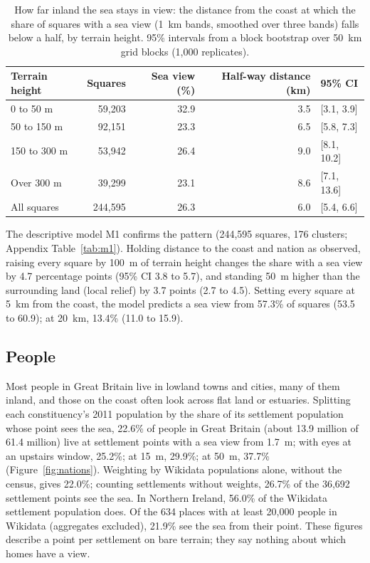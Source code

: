 \documentclass[11pt,a4paper]{article}
\begin{document}
\begin{table}[tbp]\centering\small\caption{How far inland the sea stays in view: the distance from the coast at which the share of squares with a sea view (1~km bands, smoothed over three bands) falls below a half, by terrain height. 95\% intervals from a block bootstrap over 50~km grid blocks (1,000 replicates).}\label{tab:reach}\begin{tabular}{lrrrl}\toprule Terrain height & Squares & Sea view (\%) & Half-way distance (km) & 95\% CI\\\midrule
0 to 50 m & 59,203 & 32.9 & 3.5 & [3.1, 3.9]\\
50 to 150 m & 92,151 & 23.3 & 6.5 & [5.8, 7.3]\\
150 to 300 m & 53,942 & 26.4 & 9.0 & [8.1, 10.2]\\
Over 300 m & 39,299 & 23.1 & 8.6 & [7.1, 13.6]\\
\midrule All squares & 244,595 & 26.3 & 6.0 & [5.4, 6.6]\\
\bottomrule\end{tabular}\end{table}

The descriptive model M1 confirms the pattern (244,595 squares, 176 clusters; Appendix Table~\ref{tab:m1}). Holding distance to the coast and nation as observed, raising every square by 100~m of terrain height changes the share with a sea view by 4.7 percentage points (95\% CI 3.8 to 5.7), and standing 50~m higher than the surrounding land (local relief) by 3.7 points (2.7 to 4.5). Setting every square at 5~km from the coast, the model predicts a sea view from 57.3\% of squares (53.5 to 60.9); at 20~km, 13.4\% (11.0 to 15.9).

\subsection{People}
Most people in Great Britain live in lowland towns and cities, many of them inland, and those on the coast often look across flat land or estuaries. Splitting each constituency's 2011 population by the share of its settlement population whose point sees the sea, 22.6\% of people in Great Britain (about 13.9 million of 61.4 million) live at settlement points with a sea view from 1.7~m; with eyes at an upstairs window, 25.2\%; at 15~m, 29.9\%; at 50~m, 37.7\% (Figure~\ref{fig:nations}). Weighting by Wikidata populations alone, without the census, gives 22.0\%; counting settlements without weights, 26.7\% of the 36,692 settlement points see the sea. In Northern Ireland, 56.0\% of the Wikidata settlement population does. Of the 634 places with at least 20,000 people in Wikidata (aggregates excluded), 21.9\% see the sea from their point. These figures describe a point per settlement on bare terrain; they say nothing about which homes have a view.
\end{document}
